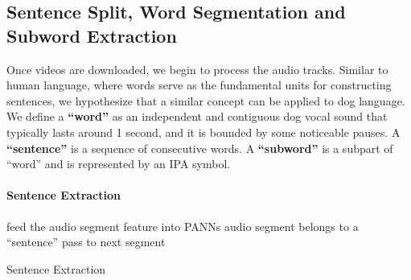 \subsection{Sentence Split, Word Segmentation and Subword Extraction}
\label{sec:divide}
Once videos are downloaded, we begin to process the audio tracks.  Similar to human language, where words serve as the fundamental units for constructing sentences, we hypothesize that a similar concept can be applied to dog language. We define a \textbf{``word''} as an independent and contiguous dog vocal sound that typically lasts around 1 second, and it is bounded by some noticeable pauses. A \textbf{``sentence''} is a sequence of consecutive words. A \textbf{``subword''} is a subpart of ``word'' and is represented by an IPA symbol.



\paragraph{Sentence Extraction}

\begin{algorithm}[]
  \SetAlgoLined
  {
    feed the audio segment feature into PANNs\;
    {
      	audio segment belongs to a ``sentence''\;
    }
	{
      pass to next segment\;
  }
  }
  \caption{Sentence Extraction}
\end{algorithm}

